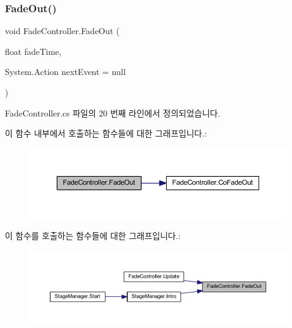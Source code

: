 \subsubsection{\texorpdfstring{FadeOut()}{FadeOut()}}
{\footnotesize\ttfamily void Fade\+Controller.\+Fade\+Out (\begin{DoxyParamCaption}\item[{float}]{fade\+Time,  }\item[{System.\+Action}]{next\+Event = {\ttfamily null} }\end{DoxyParamCaption})}



Fade\+Controller.\+cs 파일의 20 번째 라인에서 정의되었습니다.


\begin{DoxyCode}{0}

\end{DoxyCode}
이 함수 내부에서 호출하는 함수들에 대한 그래프입니다.\+:\nopagebreak
\begin{figure}[H]
\begin{center}
\leavevmode
\includegraphics[width=350pt]{d3/dd7/class_fade_controller_a0f5a8752a7f7cefa8e81b845b21b3f4a_cgraph}
\end{center}
\end{figure}
이 함수를 호출하는 함수들에 대한 그래프입니다.\+:\nopagebreak
\begin{figure}[H]
\begin{center}
\leavevmode
\includegraphics[width=350pt]{d3/dd7/class_fade_controller_a0f5a8752a7f7cefa8e81b845b21b3f4a_icgraph}
\end{center}
\end{figure}
\mbox{\label{class_fade_controller_a0503954733cfa08c0442d9101c7c13a5}} 
